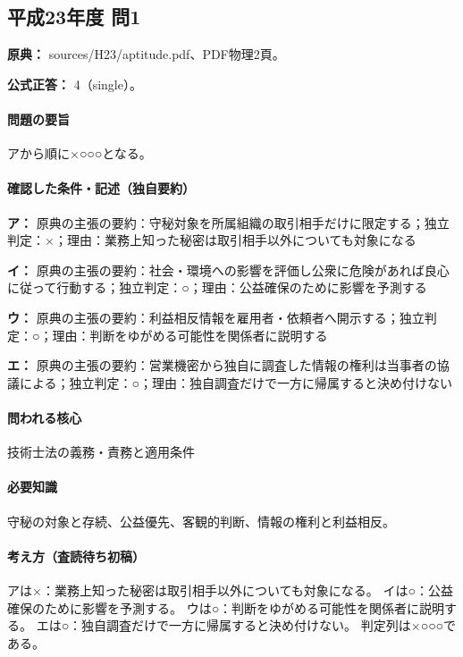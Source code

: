 \subsection{平成23年度 問1}
\label{q:h23-reg-apt-01}

\noindent\textbf{原典：} sources/H23/aptitude.pdf、PDF物理2頁。

\textbf{公式正答：} 4（single）。

\paragraph{問題の要旨} アから順に×○○○となる。

\paragraph{確認した条件・記述（独自要約）}\mbox{}\par

\noindent\textbf{ア：} 原典の主張の要約：守秘対象を所属組織の取引相手だけに限定する；独立判定：×；理由：業務上知った秘密は取引相手以外についても対象になる\par

\noindent\textbf{イ：} 原典の主張の要約：社会・環境への影響を評価し公衆に危険があれば良心に従って行動する；独立判定：○；理由：公益確保のために影響を予測する\par

\noindent\textbf{ウ：} 原典の主張の要約：利益相反情報を雇用者・依頼者へ開示する；独立判定：○；理由：判断をゆがめる可能性を関係者に説明する\par

\noindent\textbf{エ：} 原典の主張の要約：営業機密から独自に調査した情報の権利は当事者の協議による；独立判定：○；理由：独自調査だけで一方に帰属すると決め付けない\par

\paragraph{問われる核心} 技術士法の義務・責務と適用条件

\paragraph{必要知識} 守秘の対象と存続、公益優先、客観的判断、情報の権利と利益相反。

\paragraph{考え方（査読待ち初稿）} アは×：業務上知った秘密は取引相手以外についても対象になる。 イは○：公益確保のために影響を予測する。 ウは○：判断をゆがめる可能性を関係者に説明する。 エは○：独自調査だけで一方に帰属すると決め付けない。 判定列は×○○○である。

